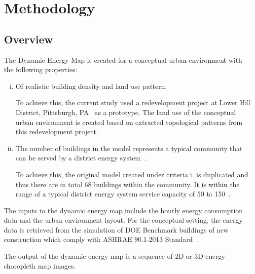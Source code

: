 
\chapter{Methodology} %

\label{Chapter4} %


\section{Overview}
The Dynamic Energy Map is created for a conceptual urban environment
with the following properties:
\begin{enumerate}[i.]
\item Of realistic building density and land use pattern.
  
  To achieve this, the current study used a redevelopment project at
  Lower Hill District, Pittsburgh, PA~\cite{Ramesh2013} as a
  prototype.  The land use of the conceptual urban environment is
  created based on extracted topological patterns from this
  redevelopment project.

\item The number of buildings in the model represents a typical
  community that can be served by a district energy
  system~\cite{IDEA2012}.
  
  To achieve this, the original model created under criteria i. is
  duplicated and thus there are in total 68 buildings within the
  community. It is within the range of a typical district energy
  system service capacity of 50 to 150~\cite{IDEA2012}.

\end{enumerate}

The inputs to the dynamic energy map include the hourly energy
consumption data and the urban environment layout. For the conceptual
setting, the energy data is retrieved from the simulation of DOE
Benchmark buildings of new construction which comply with ASHRAE
90.1-2013 Standard~\cite{DOEprototype}.

The output of the dynamic energy map is a sequence of 2D or 3D energy
choropleth map images.

